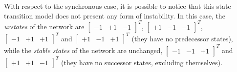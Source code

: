 \documentclass[letterpaper,headings=standardclasses]{scrartcl}
\begin{document}
With respect to the synchronous case, it is possible to notice that this state transition model does not present any form of instability. In this case, the \emph{urstates} of the network are $[\begin{matrix} -1 & +1 & -1 \end{matrix}]^T$, $[\begin{matrix} +1 & -1 & -1 \end{matrix}]^T$, $[\begin{matrix} -1 & +1 & +1 \end{matrix}]^T$ and $[\begin{matrix} +1 & -1 & +1 \end{matrix}]^T$ (they have no predecessor states), while the \emph{stable states} of the network are unchanged, $[\begin{matrix} -1 & -1 & +1 \end{matrix}]^T$ and $[\begin{matrix} +1 & +1 & -1 \end{matrix}]^T$ (they have no successor states, excluding themselves).
\end{document}
